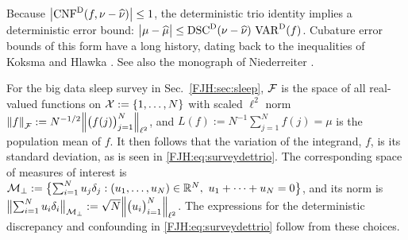 \documentclass[graybox,footinfo]{svmult}
\DeclareMathOperator{\algn}{CNF}
\DeclareMathOperator{\disc}{DSC}
\DeclareMathOperator{\Var}{VAR}
\begin{document}
Because $\abs{\algn^\Dt(f,\nu - \hnu)} \le 1$, the deterministic trio 
identity implies a deterministic error bound:  $\abs{\mu - \hmu}  \le \disc^\Dt(\nu - \hnu) 
\, \Var^{\Dt}(f)$.  
Cubature error bounds of this form have a long history, dating back to the inequalities of 
Koksma \cite{Kok42} and Hlawka \cite{Hla61}. See also the monograph of Niederreiter 
\cite{Nie92}.

For the big data sleep survey in Sec.\ \ref{FJH:sec:sleep}, $\mathcal{F}$ is the space of all 
real-valued functions on $\mathcal{X} := \{1, \ldots, N\}$ with scaled $\ell^2$ norm 
$\left \lVert f \right \rVert_{\mathcal{F}} 
:= N^{-1/2} \Bigl \lVert \bigl(f(j)\bigr)_{j=1}^N \Bigr \rVert_{\ell^2}$, and $L(f) := N^{-1}\sum_{j=1}^N f(j) 
= 
\mu $ is the population mean of $f$. It then follows that the variation of 
the integrand, $f$, is its standard deviation, as is seen in \eqref{FJH:eq:surveydettrio}.
The corresponding space of measures of interest is $\mathcal{M}_\bot := \bigl \{ \sum_{i=1}^N u_j 
\delta_{j} : (u_1, \ldots, u_N) \in {\mathbb{R}}^N,\ u_1 + \cdots + u_N= 0 \bigr \}$, and its norm is 
$\bigl \lVert \sum_{i=1}^N u_i \delta_{i} \bigr \rVert_{\mathcal{M}_\bot} : = 
	\sqrt{N} \Bigl \lVert \bigl(u_i\bigr)_{i=1}^N \Bigr \rVert_{\ell^2}$.   The expressions for the 
	deterministic 
	discrepancy and confounding in \eqref{FJH:eq:surveydettrio} follow from these 
	choices.
\end{document}

